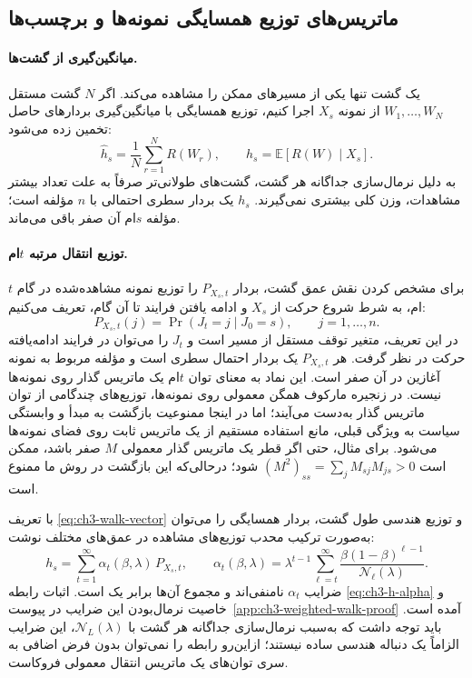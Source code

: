 \subsection{ماتریس‌های توزیع همسایگی نمونه‌ها و برچسب‌ها}
\label{subsec:ch3-representations}
\paragraph{میانگین‌گیری از گشت‌ها.}
یک گشت تنها یکی از مسیرهای ممکن را مشاهده می‌کند. اگر $N$ گشت مستقل $W_1,\ldots,W_N$ از نمونه $X_s$ اجرا کنیم، توزیع همسایگی با میانگین‌گیری بردارهای حاصل تخمین زده می‌شود:
\begin{equation}\label{eq:ch3-h-estimate}
\widehat h_s=\frac{1}{N}\sum_{r=1}^{N}R(W_r),
\qquad h_s=\mathbb E[R(W)\mid X_s].
\end{equation}
به دلیل نرمال‌سازی جداگانه هر گشت، گشت‌های طولانی‌تر صرفاً به علت تعداد بیشتر مشاهدات، وزن کلی بیشتری نمی‌گیرند. $h_s$ یک بردار سطری احتمالی با $n$ مؤلفه است؛ مؤلفه $s$ام آن صفر باقی می‌ماند.

\paragraph{توزیع انتقال مرتبه $t$ام.}
برای مشخص کردن نقش عمق گشت، بردار $P_{X_s,t}$ را توزیع نمونه مشاهده‌شده در گام $t$ام، به شرط شروع حرکت از $X_s$ و ادامه یافتن فرایند تا آن گام، تعریف می‌کنیم:
\begin{equation}\label{eq:ch3-step-observation-distribution}
P_{X_s,t}(j)=\Pr(J_t=j\mid J_0=s),
\qquad j=1,\ldots,n.
\end{equation}
در این تعریف، متغیر توقف مستقل از مسیر است و $J_t$ را می‌توان در فرایند ادامه‌یافته حرکت در نظر گرفت. هر $P_{X_s,t}$ یک بردار احتمال سطری است و مؤلفه مربوط به نمونه آغازین در آن صفر است. این نماد به معنای توان $t$ام یک ماتریس گذار روی نمونه‌ها نیست. در زنجیره مارکوف همگن معمولی روی نمونه‌ها، توزیع‌های چندگامی از توان ماتریس گذار به‌دست می‌آیند؛ اما در اینجا ممنوعیت بازگشت به مبدأ و وابستگی سیاست به ویژگی قبلی، مانع استفاده مستقیم از یک ماتریس ثابت روی فضای نمونه‌ها می‌شود. برای مثال، حتی اگر قطر یک ماتریس گذار معمولی $M$ صفر باشد، ممکن است $(M^2)_{ss}=\sum_jM_{sj}M_{js}>0$ شود؛ درحالی‌که این بازگشت در روش ما ممنوع است.

با تعریف \eqref{eq:ch3-walk-vector} و توزیع هندسی طول گشت، بردار همسایگی را می‌توان به‌صورت ترکیب محدب توزیع‌های مشاهده در عمق‌های مختلف نوشت:
\begin{equation}\label{eq:ch3-h-alpha}
\boxed{\displaystyle
h_s=\sum_{t=1}^{\infty}\alpha_t(\beta,\lambda)\,P_{X_s,t},
\qquad
\alpha_t(\beta,\lambda)=\lambda^{t-1}
\sum_{\ell=t}^{\infty}
\frac{\beta(1-\beta)^{\ell-1}}{\mathcal N_\ell(\lambda)}.}
\end{equation}
ضرایب $\alpha_t$ نامنفی‌اند و مجموع آن‌ها برابر یک است. اثبات رابطه \eqref{eq:ch3-h-alpha} و خاصیت نرمال‌بودن این ضرایب در پیوست~\ref{app:ch3-weighted-walk-proof} آمده است. باید توجه داشت که به‌سبب نرمال‌سازی جداگانه هر گشت با $\mathcal N_L(\lambda)$، این ضرایب الزاماً یک دنباله هندسی ساده نیستند؛ ازاین‌رو رابطه را نمی‌توان بدون فرض اضافی به سری توان‌های یک ماتریس انتقال معمولی فروکاست.


